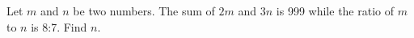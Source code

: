 
Let $m$ and $n$ be two numbers. The sum of $2m$ and $3n$ is 999 while the ratio of $m$ to $n$ is 8:7. Find $n$.




